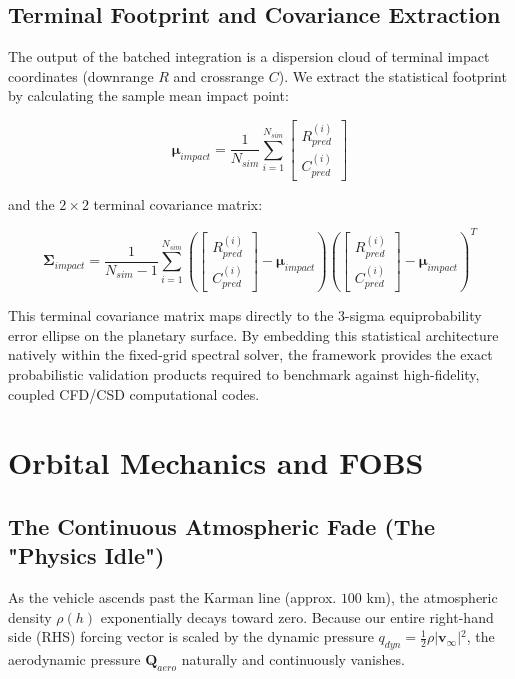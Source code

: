\documentclass[11pt,a4paper]{article}
\theoremstyle{definition}
\numberwithin{equation}{section}
\begin{document}
\subsection{Terminal Footprint and Covariance Extraction}
The output of the batched integration is a dispersion cloud of terminal impact coordinates (downrange $R$ and crossrange $C$). We extract the statistical footprint by calculating the sample mean impact point:

$$\boldsymbol{\mu}_{impact} = \frac{1}{N_{sim}} \sum_{i=1}^{N_{sim}} \begin{bmatrix} R_{pred}^{(i)} \\ C_{pred}^{(i)} \end{bmatrix}$$

and the $2 \times 2$ terminal covariance matrix:

$$\boldsymbol{\Sigma}_{impact} = \frac{1}{N_{sim} - 1} \sum_{i=1}^{N_{sim}} \left( \begin{bmatrix} R_{pred}^{(i)} \\ C_{pred}^{(i)} \end{bmatrix} - \boldsymbol{\mu}_{impact} \right) \left( \begin{bmatrix} R_{pred}^{(i)} \\ C_{pred}^{(i)} \end{bmatrix} - \boldsymbol{\mu}_{impact} \right)^T$$

This terminal covariance matrix maps directly to the 3-sigma equiprobability error ellipse on the planetary surface. By embedding this statistical architecture natively within the fixed-grid spectral solver, the framework provides the exact probabilistic validation products required to benchmark against high-fidelity, coupled CFD/CSD computational codes.

\section{Orbital Mechanics and FOBS}
\label{sec:orbital_mechanics_fobs}

\subsection{The Continuous Atmospheric Fade (The "Physics Idle")}
As the vehicle ascends past the Karman line (approx. $100$ km), the atmospheric density $\rho(h)$ exponentially decays toward zero. Because our entire right-hand side (RHS) forcing vector is scaled by the dynamic pressure $q_{dyn} = \frac{1}{2} \rho \vert{}\mathbf{v}_\infty\vert{}^2$, the aerodynamic pressure $\mathbf{Q}_{aero}$ naturally and continuously vanishes.
\end{document}
